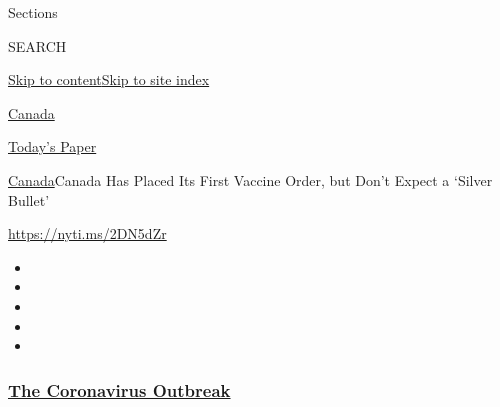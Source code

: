 Sections

SEARCH

\protect\hyperlink{site-content}{Skip to
content}\protect\hyperlink{site-index}{Skip to site index}

\href{https://www.nytimes3xbfgragh.onion/section/world/canada}{Canada}

\href{https://myaccount.nytimes3xbfgragh.onion/auth/login?response_type=cookie\&client_id=vi}{}

\href{https://www.nytimes3xbfgragh.onion/section/todayspaper}{Today's
Paper}

\href{/section/world/canada}{Canada}\textbar{}Canada Has Placed Its
First Vaccine Order, but Don't Expect a `Silver Bullet'

\url{https://nyti.ms/2DN5dZr}

\begin{itemize}
\item
\item
\item
\item
\item
\end{itemize}

\hypertarget{the-coronavirus-outbreak}{%
\subsubsection{\texorpdfstring{\href{https://www.nytimes3xbfgragh.onion/news-event/coronavirus?name=styln-coronavirus-national\&region=TOP_BANNER\&variant=undefined\&block=storyline_menu_recirc\&action=click\&pgtype=Article\&impression_id=24d07b20-e390-11ea-bc3e-7712c2f37c01}{The
Coronavirus
Outbreak}}{The Coronavirus Outbreak}}\label{the-coronavirus-outbreak}}

